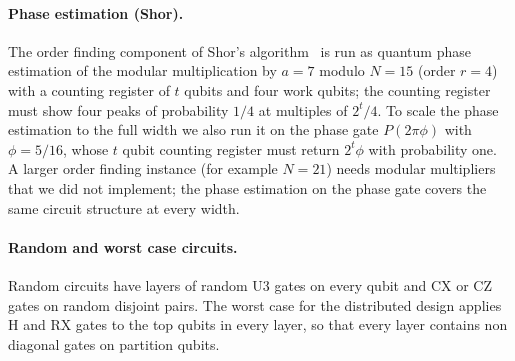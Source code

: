 \paragraph{Phase estimation (Shor).} The order finding component of Shor's algorithm~\cite{shor1997polynomial} is
run as quantum phase estimation of the modular multiplication by $a = 7$ modulo $N = 15$ (order $r = 4$) with a
counting register of $t$ qubits and four work qubits; the counting register must show four peaks of probability $1/4$
at multiples of $2^t/4$. To scale the phase estimation to the full width we also run it on the phase gate $P(2\pi\phi)$
with $\phi = 5/16$, whose $t$ qubit counting register must return $2^t\phi$ with probability one. A larger order
finding instance (for example $N = 21$) needs modular multipliers that we did not implement; the phase estimation on
the phase gate covers the same circuit structure at every width.

\paragraph{Random and worst case circuits.} Random circuits have layers of random U3 gates on every qubit and CX or
CZ gates on random disjoint pairs. The worst case for the distributed design applies H and RX gates to the top qubits
in every layer, so that every layer contains non diagonal gates on partition qubits.
